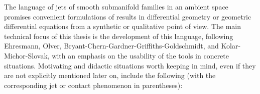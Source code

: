 \documentclass[12pt]{article}
\numberwithin{equation}{section}
\theoremstyle{plain}
\theoremstyle{definition}
\begin{document}
The language of jets of smooth submanifold families in an ambient space promises convenient formulations of results in differential geometry or geometric differential equations from a synthetic or qualitative point of view. The main technical focus of this thesis is the development of this language, following Ehresmann, Olver, Bryant-Chern-Gardner-Griffiths-Goldschmidt, and Kolar-Michor-Slovak, with an emphasis on the usability of the tools in concrete situations. Motivating and didactic situations worth keeping in mind, even if they are not explicitly mentioned later on, include the following (with the corresponding jet or contact phenomenon in parentheses):


\end{document}
